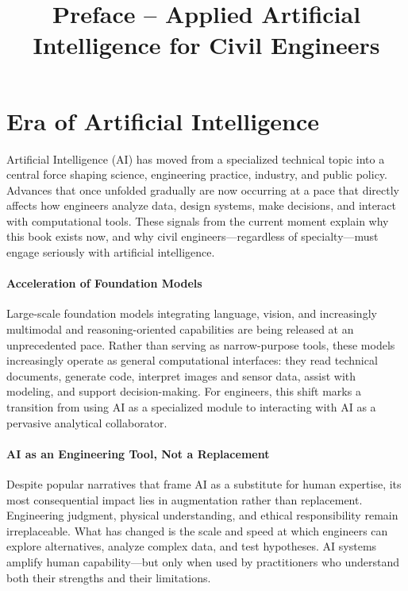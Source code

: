 \documentclass[12pt]{article}
\begin{document}
\doublespacing

\title{Preface – Applied Artificial Intelligence for Civil Engineers}
\author{}
\date{}
\maketitle


\section*{Era of Artificial Intelligence } 

Artificial Intelligence (AI) has moved from a specialized technical topic into a central force shaping science, engineering practice, industry, and public policy. Advances that once unfolded gradually are now occurring at a pace that directly affects how engineers analyze data, design systems, make decisions, and interact with computational tools. These signals from the current moment explain why this book exists now, and why civil engineers—regardless of specialty—must engage seriously with artificial intelligence.

\paragraph{Acceleration of Foundation Models}
Large-scale foundation models integrating language, vision, and increasingly multimodal and reasoning-oriented capabilities are being released at an unprecedented pace. Rather than serving as narrow-purpose tools, these models increasingly operate as general computational interfaces: they read technical documents, generate code, interpret images and sensor data, assist with modeling, and support decision-making. For engineers, this shift marks a transition from using AI as a specialized module to interacting with AI as a pervasive analytical collaborator.

\paragraph{AI as an Engineering Tool, Not a Replacement}
Despite popular narratives that frame AI as a substitute for human expertise, its most consequential impact lies in augmentation rather than replacement. Engineering judgment, physical understanding, and ethical responsibility remain irreplaceable. What has changed is the scale and speed at which engineers can explore alternatives, analyze complex data, and test hypotheses. AI systems amplify human capability—but only when used by practitioners who understand both their strengths and their limitations.
\end{document}
